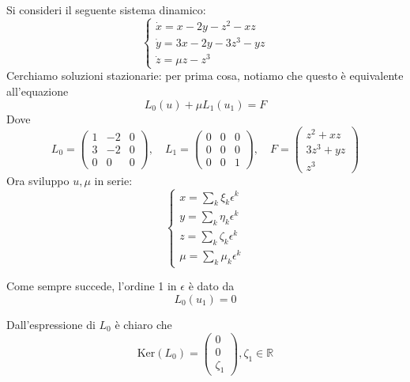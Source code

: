 \documentclass{report}
\begin{document}
\begin{example}
    Si consideri il seguente sistema dinamico: 
    \[\begin{cases}
        \dot{x} = x - 2y -z^2 - xz \\ \dot{y} = 3x - 2y - 3z^3 - yz \\ \dot{z} = \mu z - z^3
    \end{cases}\]
    Cerchiamo soluzioni stazionarie: per prima cosa, notiamo che questo è equivalente all'equazione 
    \begin{equation}
        L_0(u) + \mu L_1(u_1) = F
    \end{equation}
    Dove 
    \begin{equation}
        L_0 = \begin{pmatrix}
            1 & -2 & 0 \\ 3 & -2 & 0 \\ 0 & 0 & 0 
        \end{pmatrix}
        , \quad 
        L_1 = \begin{pmatrix}
            0 & 0 & 0 \\ 0 & 0 & 0 \\ 0 & 0 & 1
        \end{pmatrix}, \quad 
        F = \begin{pmatrix}
            z^2 + xz \\ 3z^3 + yz \\ z^3
        \end{pmatrix}
    \end{equation}
    Ora sviluppo $u, \mu$ in serie: 
    \[\begin{cases}
        x = \sum_k \xi_k \epsilon^k \\ y = \sum_k \eta_k \epsilon^k \\ z = \sum_k \zeta_k \epsilon^k \\ \mu = \sum_k \mu_k \epsilon^k
    \end{cases}\]

    Come sempre succede, l'ordine 1 in $\epsilon$ è dato da 
    \begin{equation}
        L_0 (u_1) = 0 
    \end{equation}

    Dall'espressione di $L_0$ è chiaro che 
    \begin{equation}
        \text{Ker}(L_0) = \begin{pmatrix}
            0 \\ 0 \\ \zeta_1
        \end{pmatrix}, \zeta_1 \in \mathbb{R}
    \end{equation}


\end{example}
\end{document}
